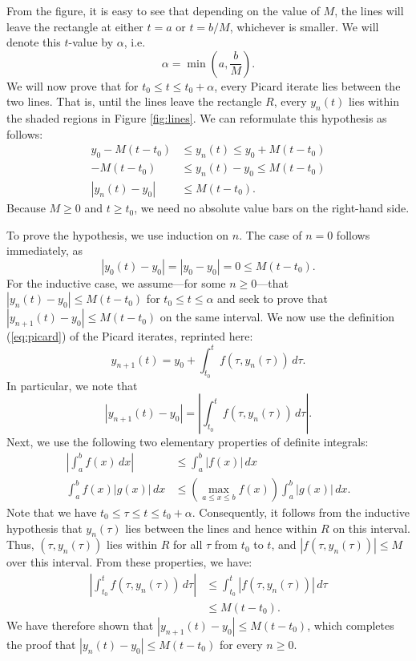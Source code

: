 \documentclass{myart}
\newcommand{\eq}[1]{(\ref{eq:#1})}
\newcommand{\Figure}[1]{Figure \ref{fig:#1}}
\begin{document}
From the figure, it is easy to see that depending on the value of $M$,
the lines will leave the rectangle at either $t = a$ or $t = b/M$,
whichever is smaller. We will denote this $t$-value by $\alpha$, i.e.
\begin{equation*}
\alpha = \min\left(a, \frac{b}{M}\right).
\end{equation*}
We will now prove that for $t_0 \leq t \leq t_0 + \alpha$, every
Picard iterate lies between the two lines. That is, until the lines
leave the rectangle $R$, every $y_n(t)$ lies within the shaded regions
in \Figure{lines}. We can reformulate this hypothesis as follows:
\begin{align*}
y_0 - M(t - t_0) &\leq y_n(t) \leq y_0 + M(t - t_0) \\
-M(t - t_0) &\leq y_n(t) - y_0 \leq M(t - t_0) \\
|y_n(t) - y_0| &\leq M(t - t_0).
\end{align*}
Because $M \geq 0$ and $t \geq t_0$, we need no absolute value bars on
the right-hand side.

To prove the hypothesis, we use induction on $n$. The case of $n = 0$
follows immediately, as
\begin{equation*}
|y_0(t) - y_0| = |y_0 - y_0| = 0 \leq M(t - t_0).
\end{equation*}
For the inductive case, we assume---for some $n \geq 0$---that
$|y_n(t) - y_0| \leq M(t - t_0)$ for $t_0 \leq t \leq \alpha$ and seek
to prove that $|y_{n+1}(t) - y_0| \leq M(t - t_0)$ on the same
interval. We now use the definition \eq{picard} of the Picard
iterates, reprinted here:
\begin{equation*}
y_{n+1}(t) = y_0 + \int_{t_0}^t f(\tau, y_n(\tau)) \,d\tau.
\end{equation*}
In particular, we note that
\begin{equation*}
|y_{n+1}(t) - y_0| = \left|\int_{t_0}^t f(\tau, y_n(\tau)) \,d\tau\right|.
\end{equation*}
Next, we use the following two elementary properties of definite
integrals:
\begin{align*}
      \left|\int_a^b f(x) \,dx\right|
&\leq \int_a^b |f(x)| \,dx \\
      \int_a^b f(x)|g(x)| \,dx
&\leq \left(\max_{a \leq x \leq b} f(x)\right)\int_a^b |g(x)| \,dx.
\end{align*}
Note that we have $t_0 \leq \tau \leq t \leq t_0 + \alpha$.
Consequently, it follows from the inductive hypothesis that
$y_n(\tau)$ lies between the lines and hence within $R$ on this
interval. Thus, $(\tau, y_n(\tau))$ lies within $R$ for all $\tau$
from $t_0$ to $t$, and $|f(\tau, y_n(\tau))| \leq M$ over this
interval. From these properties, we have:
\begin{align*}
      \left|\int_{t_0}^t f(\tau, y_n(\tau)) \,d\tau\right|
&\leq \int_{t_0}^t |f(\tau, y_n(\tau))| \,d\tau \\
&\leq M(t - t_0).
\end{align*}
We have therefore shown that $|y_{n+1}(t) - y_0| \leq M(t - t_0)$,
which completes the proof that $|y_n(t) - y_0| \leq M(t - t_0)$ for
every $n \geq 0$.
\end{document}
